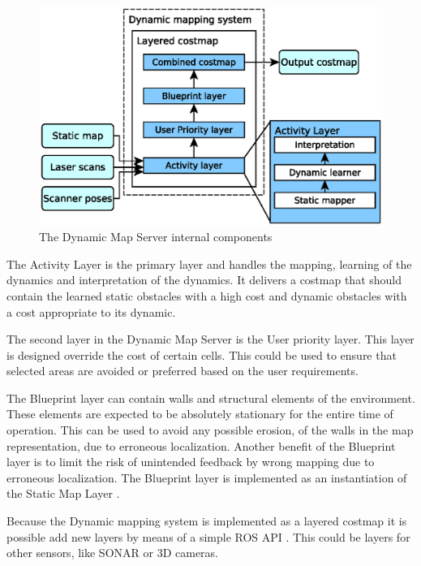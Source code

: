 \begin{figure}[htbp]
	\centering
	\includegraphics[scale=0.7]{chapters/cost_interpretation/figures/implementation_overview.eps}
	\caption{The Dynamic Map Server internal components}
	\label{fig:dynamic_map_server_internal}
\end{figure}


The Activity Layer is the primary layer and handles the mapping, learning of the dynamics and interpretation of the dynamics. It delivers a costmap that should contain the learned static obstacles with a high cost and dynamic obstacles with a cost appropriate to its dynamic. 

The second layer in the Dynamic Map Server is the User priority layer. This layer is designed override the cost of certain cells. This could be used to ensure that selected areas are avoided or preferred based on the user requirements. 

The Blueprint layer can contain walls and structural elements of the environment.
These elements are expected to be absolutely stationary for the entire time of operation.
This can be used to avoid any possible erosion, of the walls in the map representation, due to erroneous localization.
Another benefit of the Blueprint layer is to limit the risk of unintended feedback by wrong mapping due to  erroneous localization.
The Blueprint layer is implemented as an instantiation of the Static Map Layer \cite{lu2014layered}. 

Because the Dynamic mapping system is implemented as a layered costmap it is possible add new layers by means of a simple ROS API \cite{plugin_lib}. This could be layers for other sensors, like SONAR \cite{range_sensor_layer} or 3D cameras.